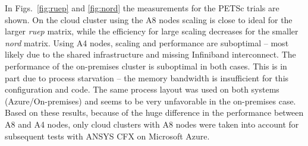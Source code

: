\documentclass[3p,times]{elsarticle}
\begin{document}
In Figs.~\ref{fig:ruep} and \ref{fig:nord} the measurements for the PETSc trials are shown. On the cloud cluster using the A8 nodes scaling is close to ideal for the larger \textit{ruep} matrix, while the efficiency for large scaling decreases for the smaller \textit{nord} matrix. Using A4 nodes, scaling and performance are suboptimal -- most likely due to the shared infrastructure and missing Infiniband interconnect.  The performance of the on-premises cluster is suboptimal in both cases. This is in part due to process starvation -- the memory bandwidth is insufficient for this configuration and code. The same process layout was used on both systems (Azure/On-premises) and seems to be very unfavorable in the on-premises case.\\
Based on these results, because of the huge difference in the performance between A8 and A4 nodes, only cloud clusters with A8 nodes were taken into account for subsequent tests with ANSYS CFX on Microsoft Azure.
\end{document}
